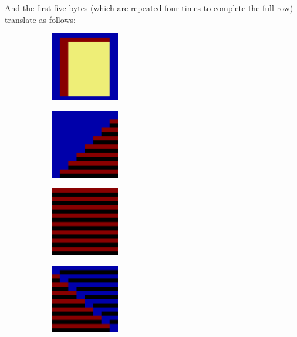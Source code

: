 \captionsetup[subfigure]{font=large,labelfont=large,labelformat=empty}
And the first five bytes (which are repeated four times to complete the full row) translate as follows:
\begin{figure}[H]
  {
    \setlength{\tabcolsep}{3.0pt}
    \setlength\cmidrulewidth{\heavyrulewidth} %
    \begin{adjustbox}{width=15cm,center}
      \begin{subfigure}{0.3\textwidth}
        \includegraphics[width=3cm]{src/bonusphase/row21_cell0.png}%
        \caption{}
      \end{subfigure}
      \begin{subfigure}{0.3\textwidth}
        \includegraphics[width=3cm]{src/bonusphase/row21_cell1.png}%
        \caption{}
      \end{subfigure}
      \begin{subfigure}{0.3\textwidth}
        \includegraphics[width=3cm]{src/bonusphase/row21_cell2.png}%
        \caption{}
      \end{subfigure}
      \begin{subfigure}{0.3\textwidth}
        \includegraphics[width=3cm]{src/bonusphase/row21_cell3.png}%

\end{subfigure}
\end{adjustbox}}
\end{figure}
